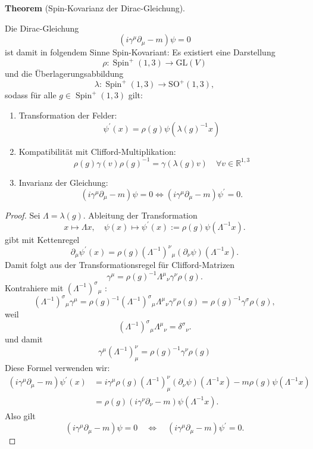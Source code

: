 \documentclass[10pt, letterpaper]{article}
\newcommand{\CustomHeading}[3]{%
  \par\medskip\noindent%
  \textbf{#1 #2} \textnormal{(#3)}.\enskip%
}
\newenvironment{THEO}[2]{\CustomHeading{Theorem}{#1}{#2}}{}
\begin{document}
\begin{THEO}{}{Spin-Kovarianz der Dirac-Gleichung}
Die Dirac-Gleichung
$$
\left(i \gamma^\mu \partial_\mu-m\right) \psi=0
$$
ist damit in folgendem Sinne Spin-Kovariant: Es existiert eine Darstellung
$$
\rho:  \operatorname{Spin}^{+}(1,3) \rightarrow  \mathrm{GL}(V)
$$
und die Überlagerungsabbildung
$$
\lambda: \operatorname{Spin}^{+}(1,3) \rightarrow \mathrm{SO}^{+}(1,3),
$$
sodass für alle $g \in \operatorname{Spin}^{+}(1,3)$ gilt: 
\begin{enumerate}
  \item Transformation der Felder:
  $$
  \psi^{\prime}(x)=\rho(g) \psi\left(\lambda(g)^{-1} x\right)
  $$
  \item Kompatibilität mit Clifford-Multiplikation:
  $$
  \rho(g) \gamma(v) \rho(g)^{-1}=\gamma(\lambda(g) v) \quad \forall v \in \mathbb{R}^{1,3}
  $$
  \item Invarianz der Gleichung:
  $$
  \left(i \gamma^\mu \partial_\mu-m\right) \psi=0 \Longleftrightarrow\left(i \gamma^\mu \partial_\mu-m\right) \psi^{\prime}=0 .
  $$
\end{enumerate}
\end{THEO}

\begin{proof}

Sei $\Lambda=\lambda(g)$. Ableitung der Transformation  
$$
x \mapsto \Lambda x, \quad \psi(x) \mapsto \psi^{\prime}(x):=\rho(g) \psi\left(\Lambda^{-1} x\right) .
$$
gibt mit Kettenregel
$$
\partial_\mu \psi^{\prime}(x)=\rho(g)\left(\Lambda^{-1}\right)^\nu{ }_\mu\left(\partial_\nu \psi\right)\left(\Lambda^{-1} x\right) .
$$
Damit folgt aus der Transformationsregel für Clifford-Matrizen
$$
\gamma^\mu=\rho(g)^{-1} \Lambda^\mu{ }_\nu \gamma^\nu \rho(g) .
$$
Kontrahiere mit $\left(\Lambda^{-1}\right)^\sigma{ }_\mu$ :
$$
\left(\Lambda^{-1}\right)^\sigma{ }_\mu \gamma^\mu=\rho(g)^{-1}\left(\Lambda^{-1}\right)^\sigma{ }_\mu \Lambda^\mu{ }_\nu \gamma^\nu \rho(g)=\rho(g)^{-1} \gamma^\sigma \rho(g),
$$
weil
$$
\left(\Lambda^{-1}\right)^\sigma{ }_\mu \Lambda^\mu{ }_\nu=\delta^\sigma{ }_\nu .
$$
und damit
$$
\gamma^\mu\left(\Lambda^{-1}\right)_\mu^\nu=\rho(g)^{-1} \gamma^\nu \rho(g)
$$
Diese Formel verwenden wir:
$$
\begin{aligned}
\left(i \gamma^\mu \partial_\mu-m\right) \psi^{\prime}(x) & =i \gamma^\mu \rho(g)\left(\Lambda^{-1}\right)_\mu^\nu\left(\partial_\nu \psi\right)\left(\Lambda^{-1} x\right)-m \rho(g) \psi\left(\Lambda^{-1} x\right) \\
& =\rho(g)\left(i \gamma^\nu \partial_\nu-m\right) \psi\left(\Lambda^{-1} x\right) .
\end{aligned}
$$
Also gilt
$$
\left(i \gamma^\mu \partial_\mu-m\right) \psi=0 \quad \Longleftrightarrow \quad\left(i \gamma^\mu \partial_\mu-m\right) \psi^{\prime}=0 .
$$
\end{proof}
\end{document}
